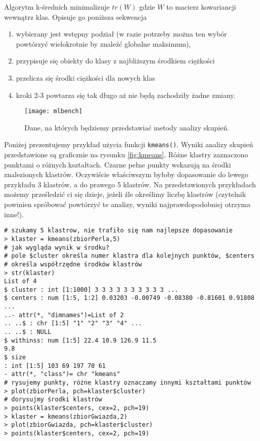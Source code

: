 \documentclass[polish,]{book}
\begin{document}
Algorytm k-średnich minimalizuje \(tr(W)\) gdzie \(W\) to macierz kowariancji wewnątrz klas. Opisuje go poniższa sekwencja

\begin{enumerate}
\def\labelenumi{\arabic{enumi}.}
\item
  wybierany jest wstępny podział (w razie potrzeby można ten wybór powtórzyć
  wielokrotnie by znaleźć globalne maksimum),
\item
  przypisuje się obiekty do klasy z najbliższym środkiem ciężkości
\item
  przelicza się środki ciężkości dla nowych klas
\item
  kroki 2-3 powtarza się tak długo aż nie będą zachodziły żadne zmiany.
\end{enumerate}

\begin{figure}[h]

{\centering \texttt{[image: mlbench]} 

}

\caption{Dane, na których będziemy przedstawiać metody analizy skupień.}\label{fig:mlbench}
\end{figure}

Poniżej prezentujemy przykład użycia funkcji \texttt{kmeans()}. Wyniki analizy skupień
przedstawione są graficznie na rysunku \ref{fig:kmeans}. Różne klastry zaznaczono punktami
o różnych kształtach. Czarne pełne punkty wskazują na środki znalezionych klastrów. Oczywiście właściwszym byłoby dopasowanie do lewego przykładu 3 klastrów, a do prawego 5 klastrów. Na przedstawionych przykładach możemy prześledzić ci się dzieje, jeżeli źle określimy liczbę klastrów (czytelnik powinien spróbować powtórzyć te analizy, wyniki najprawdopodobniej otrzyma inne!).

\begin{verbatim}
# szukamy 5 klastrow, nie trafiło się nam najlepsze dopasowanie
> klaster = kmeans(zbiorPerla,5)
# jak wygląda wynik w środku?
# pole $cluster określa numer klastra dla kolejnych punktów, $centers
# określa współrzędne środków klastrów
> str(klaster)
List of 4
$ cluster : int [1:1000] 3 3 3 3 3 3 3 3 3 3 ...
$ centers : num [1:5, 1:2] 0.03203 -0.00749 -0.08380 -0.81601 0.91808
...
..- attr(*, "dimnames")=List of 2
.. ..$ : chr [1:5] "1" "2" "3" "4" ...
.. ..$ : NULL
$ withinss: num [1:5] 22.4 10.9 126.9 11.5
9.8
$ size
: int [1:5] 103 69 197 70 61
- attr(*, "class")= chr "kmeans"
# rysujemy punkty, różne klastry oznaczamy innymi kształtami punktów
> plot(zbiorPerla, pch=klaster$cluster)
# dorysujmy środki klastrów
> points(klaster$centers, cex=2, pch=19)
> klaster = kmeans(zbiorGwiazda,2)
> plot(zbiorGwiazda, pch=klaster$cluster)
> points(klaster$centers, cex=2, pch=19)
\end{verbatim}
\end{document}
